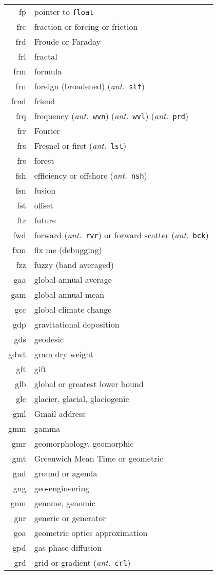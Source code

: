 \documentclass[12pt,twoside]{article}
\newcommand{\ant}[1]{(\textit{ant.}~\texttt{#1})}
\begin{document}
\begin{longtable}[>{\bfseries}l]{>{\ttfamily}r l}
fp & pointer to \texttt{float} \\
frc & fraction or forcing or friction \\
frd & Froude or Faraday \\
frl & fractal \\
frm & formula \\
frn & foreign (broadened) \ant{slf} \\
frnd & friend \\
frq & frequency \ant{wvn} \ant{wvl} \ant{prd} \\
frr & Fourier \\
frs & Fresnel or first \ant{lst} \\
frs & forest \\
fsh & efficiency or offshore \ant{nsh} \\
fsn & fusion \\
fst & offset \\
ftr & future \\
fwd & forward \ant{rvr} or forward scatter \ant{bck} \\
fxm & fix me (debugging) \\
fzz & fuzzy (band averaged) \\
gaa & global annual average \\
gam & global annual mean \\
gcc & global climate change \\
gdp & gravitational deposition \\
gds & geodesic \\
gdwt & gram dry weight \\
gft & gift \\
glb & global or greatest lower bound \\
glc & glacier, glacial, glaciogenic \\
gml & Gmail address \\
gmm & gamma \\
gmr & geomorphology, geomorphic \\
gmt & Greenwich Mean Time or geometric \\
gnd & ground or agenda \\
gng & geo-engineering \\
gnm & genome, genomic \\
gnr & generic or generator \\
goa & geometric optics approximation \\
gpd & gas phase diffusion \\
grd & grid or gradient \ant{crl} \\

\end{longtable}
\end{document}
